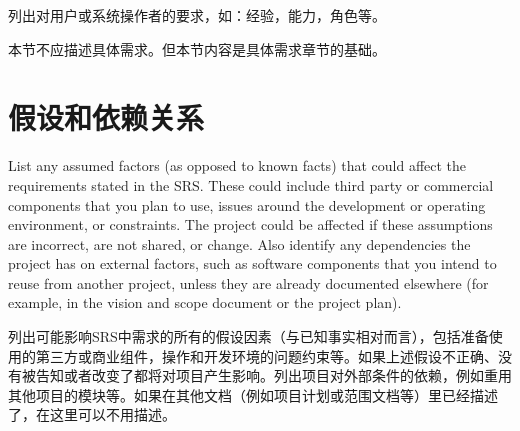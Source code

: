 列出对用户或系统操作者的要求，如：经验，能力，角色等。

本节不应描述具体需求。但本节内容是具体需求章节的基础。

\section{假设和依赖关系}
List any assumed factors (as opposed to known facts) that could affect the requirements stated in the SRS. These could include third party or commercial components that you plan to use, issues around the development or operating environment, or constraints. The project could be affected if these assumptions are incorrect, are not shared, or change. Also identify any dependencies the project has on external factors, such as software components that you intend to reuse from another project, unless they are already documented elsewhere (for example, in the vision and scope document or the project plan). 

列出可能影响SRS中需求的所有的假设因素（与已知事实相对而言），包括准备使用的第三方或商业组件，操作和开发环境的问题约束等。如果上述假设不正确、没有被告知或者改变了都将对项目产生影响。列出项目对外部条件的依赖，例如重用其他项目的模块等。如果在其他文档（例如项目计划或范围文档等）里已经描述了，在这里可以不用描述。
